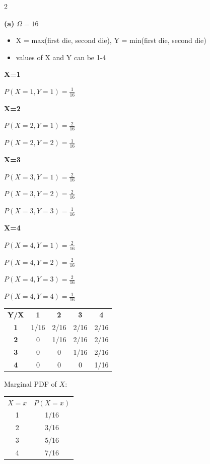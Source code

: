 \documentclass[12 pt]{article}
\begin{document}
    \begin{exercise}{2}
    \hfill
    
    \textbf{(a)} $\Omega = 16$
    \begin{itemize}
        \item X = max(first die, second die), Y = min(first die, second die)
        \item values of X and Y can be 1-4
    \end{itemize}

    \hfill

    \textbf{X=1}
    
    $P(X=1, Y=1) = \frac{1}{16}$

    \textbf{X=2}

    $P(X=2, Y=1) = \frac{2}{16}$

    $P(X=2, Y=2) = \frac{1}{16}$

    \textbf{X=3}

    $P(X=3, Y=1) = \frac{2}{16}$

    $P(X=3, Y=2) = \frac{2}{16}$

    $P(X=3, Y=3) = \frac{1}{16}$

    \textbf{X=4}

    $P(X=4, Y=1) = \frac{2}{16}$

    $P(X=4, Y=2) = \frac{2}{16}$

    $P(X=4, Y=3) = \frac{2}{16}$

    $P(X=4, Y=4) = \frac{1}{16}$

    \hfill

    \begin{tabular}{c|c|c|c|c}
        \textbf{Y/X} & \textbf{1} & \textbf{2} & \textbf{3} & \textbf{4} \\
         \textbf{1} & 1/16 & 2/16 & 2/16 & 2/16 \\
         \textbf{2} & 0 & 1/16 & 2/16 & 2/16 \\
         \textbf{3} & 0 & 0 & 1/16 & 2/16 \\
         \textbf{4} & 0 & 0 & 0 & 1/16 \\
    \end{tabular}

    \hfill

    Marginal PDF of $X$:

    \begin{tabular}{c|c}
        $X=x$ & $P(X=x)$  \\
        1 & 1/16 \\
        2 & 3/16 \\
        3 & 5/16 \\
        4 & 7/16
    \end{tabular}


\end{exercise}
\end{document}
